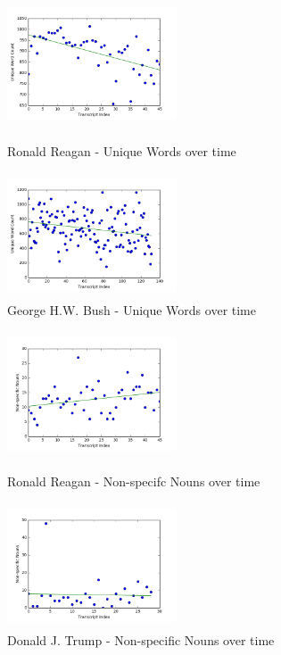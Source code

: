 \documentclass[10pt]{article}
\begin{document}
\onecolumn
\begin{figure}[H]
	\centering
	\begin{minipage}[b]{0.4\textwidth}
		\includegraphics[width=190px, height=140px]{images/RRUniqueWords.png}
		\caption{Ronald Reagan - Unique Words over time}
	\end{minipage}
	\hfill
	\begin{minipage}[b]{0.4\textwidth}
		\includegraphics[width=190px, height=140px]{images/GWHBUniqueWords.png}
		\caption{George H.W. Bush - Unique Words over time}
	\end{minipage}
\end{figure}

\begin{figure}[H]
	\centering
	\begin{minipage}[b]{0.4\textwidth}
		\includegraphics[width=190px, height=140px]{images/RRNSNouns.png}
		\caption{Ronald Reagan - Non-specifc Nouns over time}
	\end{minipage}
	\hfill
	\begin{minipage}[b]{0.4\textwidth}
		\includegraphics[width=190px, height=140px]{images/DJTNSNouns.png}
		\caption{Donald J. Trump - Non-specific Nouns over time}
	\end{minipage}
\end{figure}
\end{document}
